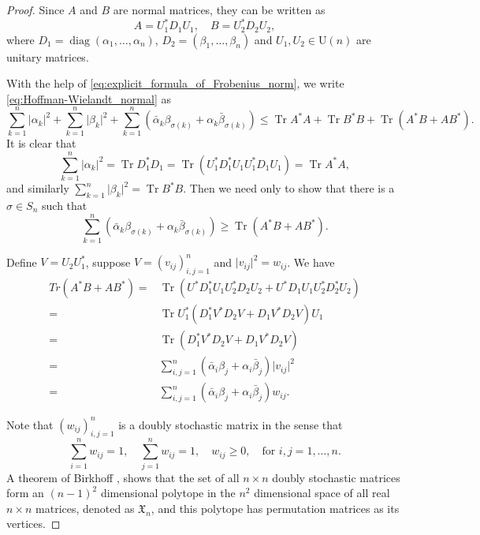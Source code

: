 \documentclass[11pt, a4paper]{article}
\numberwithin{equation}{section}
\newcommand{\Unitary}{\mathrm{U}}
\newcommand{\doublystochastic}{\mathfrak{X}}
\DeclareMathOperator{\diag}{diag}
\DeclareMathOperator{\Tr}{Tr}
\theoremstyle{definition}
\theoremstyle{remark}
\begin{document}
\begin{proof}
  Since $A$ and $B$ are normal matrices, they can be written as
  \begin{equation}
    A = U^*_1 D_1 U_1, \quad B = U^*_2 D_2 U_2,
  \end{equation}
  where $D_1 = \diag(\alpha_1, \dotsc, \alpha_n)$, $D_2 = (\beta_1, \dotsc, \beta_n)$ and $U_1, U_2 \in \Unitary(n)$ are unitary matrices.

  With the help of \eqref{eq:explicit_formula_of_Frobenius_norm}, we write \eqref{eq:Hoffman-Wielandt_normal} as
  \begin{equation}
    \sum^n_{k = 1} \lvert \alpha_k \rvert^2 + \sum^n_{k = 1} \lvert \beta_k \rvert^2 + \sum^n_{k = 1} (\bar{\alpha}_k \beta_{\sigma(k)} + \alpha_k \bar{\beta}_{\sigma(k)}) \leq \Tr A^* A + \Tr B^* B + \Tr(A^* B + A B^*).
  \end{equation}
  It is clear that
  \begin{equation}
    \sum^n_{k = 1} \lvert \alpha_k \rvert^2 = \Tr D^*_1 D_1 = \Tr(U^*_1 D^*_1 U_1 U^*_1 D_1 U_1) = \Tr A^* A,
  \end{equation}
  and similarly $\sum^n_{k = 1} \lvert \beta_k \rvert^2 = \Tr B^* B$. Then we need only to show that there is a $\sigma \in S_n$ such that
  \begin{equation}
    \sum^n_{k = 1} (\bar{\alpha}_k \beta_{\sigma(k)} + \alpha_k \bar{\beta}_{\sigma(k)}) \geq \Tr(A^* B + A B^*).
  \end{equation}

  Define $V = U_2 U^*_1$, suppose $V = (v_{ij})^n_{i, j = 1}$ and $\lvert v_{ij} \rvert^2 = w_{ij}$. We have
  \begin{equation} \label{eq:entriy_expansion_of_H-W}
    \begin{split}
      Tr(A^* B + A B^*) = {}& \Tr(U^* D^*_1 U_1 U^*_2 D_2 U_2 + U^* D_1 U_1 U^*_2 D^*_2 U_2) \\
      = {}& \Tr U^*_1 (D^*_1 V^* D_2 V + D_1 V^* D_2 V) U_1 \\
      = {}& \Tr (D^*_1 V^* D_2 V + D_1 V^* D_2 V) \\
      = {}& \sum^n_{i, j = 1} (\bar{\alpha}_i \beta_j + \alpha_i \bar{\beta}_j) \lvert v_{ij} \rvert^2 \\
      = {}& \sum^n_{i, j = 1} (\bar{\alpha}_i \beta_j + \alpha_i \bar{\beta}_j) w_{ij}.
    \end{split}
  \end{equation}

  Note that $(w_{ij})^n_{i, j = 1}$ is a doubly stochastic matrix in the sense that
  \begin{equation}
    \sum^n_{i = 1} w_{ij} = 1, \quad \sum^n_{j = 1} w_{ij} = 1, \quad w_{ij} \geq 0, \quad \text{for $i, j = 1, \dotsc, n$.}
  \end{equation}
  A theorem of Birkhoff \cite[Section 8.7]{Horn-Johnson90}, \cite{Birkhoff46} shows that the set of all $n \times n$ doubly stochastic matrices form an $(n - 1)^2$ dimensional polytope in the $n^2$ dimensional space of all real $n \times n$ matrices, denoted as $\doublystochastic_n$, and this polytope has permutation matrices as its vertices.


\end{proof}
\end{document}
